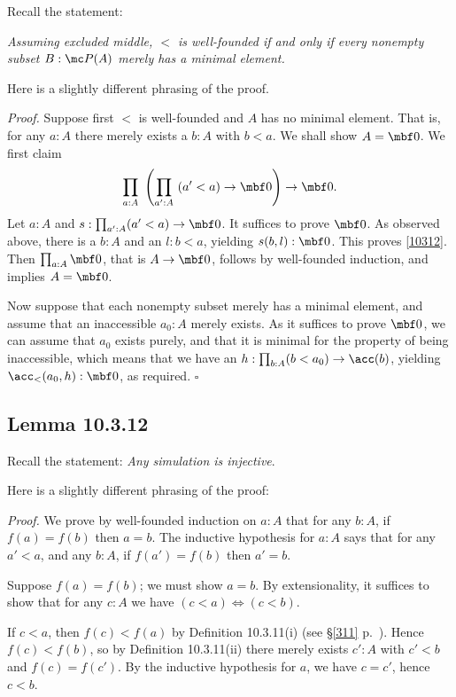 \documentclass[12pt]{article}
\begin{document}
Recall the statement: 

\nn\emph{Assuming excluded middle, $<$ is well-founded if and only if every nonempty subset $B:\mc P(A)$ merely has a minimal element.} 

Here is a slightly different phrasing of the proof.

\nn\emph{Proof.} Suppose first $<$ is well-founded and $A$ has no minimal element. That is, for any $a:A$ there merely exists a $b:A$ with $b<a$. We shall show $A=\mbf0$. We first claim 
\begin{equation}\label{10312}
\prod_{a:A}\ \left(\prod_{a':A}\ (a'<a)\to\mbf0\right)\to\mbf0.
\end{equation}
Let $a:A$ and $s:\prod_{a':A}(a'<a)\to\mbf0$. It suffices to prove $\mbf0$. As observed above, there is a $b:A$ and an $l:b<a$, yielding $s(b,l):\mbf0$. This proves \eqref{10312}. Then $\prod_{a:A}\mbf0$, that is $A\to\mbf0$, follows by well-founded induction, and implies $A=\mbf0$. 

Now suppose that each nonempty subset merely has a minimal element, and assume that an inaccessible $a_0:A$ merely exists. As it suffices to prove $\mbf0$, we can assume that $a_0$ exists purely, and that it is minimal for the property of being inaccessible, which means that we have an $h:\prod_{b:A}(b<a_0)\to\acc(b)$, yielding $\acc_<(a_0,h):\mbf0$, as required. $\square$


\subsection{Lemma 10.3.12}

Recall the statement: \emph{Any simulation is injective}.

Here is a slightly different phrasing of the proof:

\nn\emph{Proof.} We prove by well-founded induction on $a:A$ that for any $b:A$, if $f(a)=f(b)$ then $a=b$. The inductive hypothesis for $a:A$ says that for any $a'<a$, and any $b:A$, if $f(a')=f(b)$ then $a'=b$.

Suppose $f(a)=f(b)$; we must show $a=b$. By extensionality, it suffices to show that for any $c:A$ we have $(c<a)\Leftrightarrow(c<b)$. 

If $c<a$, then $f(c)<f(a)$ by Definition 10.3.11(i) (see \S\ref{311} p.~\pageref{311}). Hence $f(c)<f(b)$, so by Definition 10.3.11(ii) there merely exists $c':A$ with $c'<b$ and $f(c)=f(c')$. By the inductive hypothesis for $a$, we have $c=c'$, hence $c<b$. 
\end{document}
